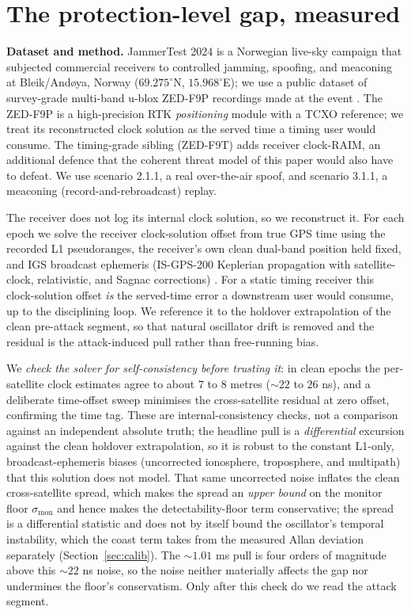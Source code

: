 \documentclass[conference]{IEEEtran}
\begin{document}
\section{The protection-level gap, measured}
\label{sec:gap}
\textbf{Dataset and method.} JammerTest 2024 is a Norwegian live-sky campaign that
subjected commercial receivers to controlled jamming, spoofing, and meaconing at
Bleik/And\o ya, Norway ($69.275^\circ$N, $15.968^\circ$E); we use a public dataset
of survey-grade multi-band u-blox ZED-F9P recordings made at the event
\cite{jammertest}. The ZED-F9P is a high-precision RTK \emph{positioning} module
with a TCXO reference; we treat its reconstructed clock solution as the served time
a timing user would consume. The timing-grade sibling (ZED-F9T) adds receiver
clock-RAIM, an additional defence that the coherent threat model of this paper would
also have to defeat. We use scenario 2.1.1, a real over-the-air spoof, and scenario
3.1.1, a meaconing (record-and-rebroadcast) replay.

The receiver does not log its internal clock solution, so we reconstruct it. For
each epoch we solve the receiver clock-solution offset from true GPS time using the
recorded L1 pseudoranges, the receiver's own clean dual-band position held fixed,
and IGS broadcast ephemeris (IS-GPS-200 Keplerian propagation with satellite-clock,
relativistic, and Sagnac corrections) \cite{isgps200,kaplan}. For a static timing
receiver this clock-solution offset \emph{is} the served-time error a downstream
user would consume, up to the disciplining loop. We reference it to the holdover
extrapolation of the clean pre-attack segment, so that natural oscillator drift is
removed and the residual is the attack-induced pull rather than free-running bias.

We \emph{check the solver for self-consistency before trusting it}: in clean epochs
the per-satellite clock estimates agree to about $7$ to $8$ metres ($\sim$$22$ to
$26$ ns), and a deliberate time-offset sweep minimises the cross-satellite residual
at zero offset, confirming the time tag. These are internal-consistency checks, not
a comparison against an independent absolute truth; the headline pull is a
\emph{differential} excursion against the clean holdover extrapolation, so it is
robust to the constant L1-only, broadcast-ephemeris biases (uncorrected ionosphere,
troposphere, and multipath) that this solution does not model. That same uncorrected
noise inflates the clean cross-satellite spread, which makes the spread an
\emph{upper bound} on the monitor floor $\sigma_{\mathrm{mon}}$ and hence makes the
detectability-floor term conservative; the spread is a differential statistic and
does not by itself bound the oscillator's temporal instability, which the coast term
takes from the measured Allan deviation separately (Section~\ref{sec:calib}). The
$\sim$$1.01$ ms pull is four orders of magnitude above this $\sim$$22$ ns noise, so
the noise neither materially affects the gap nor undermines the floor's
conservatism. Only after this check do we read the attack segment.
\end{document}
